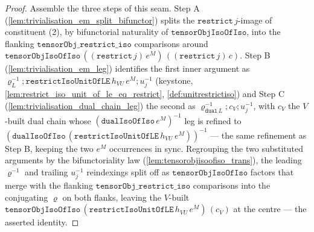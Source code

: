 \begin{proof}
  \leanok
  Assemble the three steps of this seam. Step A (\cref{lem:trivialisation_em_split_bifunctor}) splits the
  \(\mathtt{restrict}\,j\)-image of constituent (2), by bifunctorial naturality of
  \(\mathtt{tensorObjIsoOfIso}\), into the flanking \(\mathtt{tensorObj\_restrict\_iso}\) comparisons
  around \(\mathtt{tensorObjIsoOfIso}\,((\mathtt{restrict}\,j)\,e^M)\,((\mathtt{restrict}\,j)\,c)\). Step B
  (\cref{lem:trivialisation_em_leg}) identifies the first inner argument as
  \(\varrho_L^{-1} \mathbin{;} \mathtt{restrictIsoUnitOfLE}\,h_{VU}\,e^M \mathbin{;} u_j^{-1}\) (keystone,
  \cref{lem:restrict_iso_unit_of_le_eq_restrict}, \cref{def:unitrestrictiso}) and Step C
  (\cref{lem:trivialisation_dual_chain_leg}) the second as
  \(\varrho_{\mathtt{dual}\,L}^{-1} \mathbin{;} c_V \mathbin{;} u_j^{-1}\), with \(c_V\) the \(V\)-built dual
  chain whose \((\mathtt{dualIsoOfIso}\,e^M)^{-1}\) leg is refined to
  \((\mathtt{dualIsoOfIso}\,(\mathtt{restrictIsoUnitOfLE}\,h_{VU}\,e^M))^{-1}\) --- the same refinement as
  Step B, keeping the two \(e^M\) occurrences in sync. Regrouping the two substituted arguments by the
  bifunctoriality law (\cref{lem:tensorobjisoofiso_trans}), the leading \(\varrho^{-1}\) and trailing
  \(u_j^{-1}\) reindexings split off as \(\mathtt{tensorObjIsoOfIso}\) factors that merge with the flanking
  \(\mathtt{tensorObj\_restrict\_iso}\) comparisons into the conjugating \(\varrho\) on both flanks,
  leaving the \(V\)-built \(\mathtt{tensorObjIsoOfIso}\,(\mathtt{restrictIsoUnitOfLE}\,h_{VU}\,e^M)\,(c_V)\)
  at the centre --- the asserted identity.
\end{proof}

